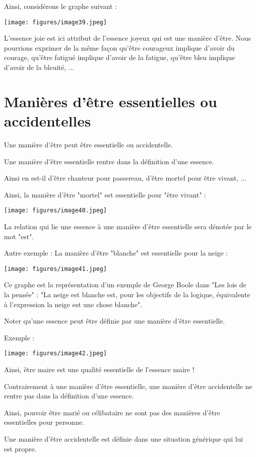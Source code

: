 \documentclass[a4paper, 12pt, openright, french]{book}
\begin{document}
Ainsi, considérons le graphe suivant :

\texttt{[image: figures/image39.jpeg]}

L'essence joie est ici attribut de
l'essence joyeux qui est une manière
d'être. Nous pourrions exprimer de la même façon
qu'être courageux implique d'avoir du
courage, qu'être fatigué implique
d'avoir de la fatigue, qu'être bleu
implique d'avoir de la bleuité, ...

\section{Manières d'être essentielles ou accidentelles}

Une manière d'être peut être essentielle ou
accidentelle.

Une manière d'être essentielle rentre dans la définition
d'une essence.

Ainsi en est-il d'être chanteur pour passereau,
d'être mortel pour être vivant, ...

Ainsi, la manière d'être "mortel" est essentielle pour
"être vivant" :

\texttt{[image: figures/image40.jpeg]}

La relation qui lie une essence à une manière d'être
essentielle sera dénotée par le mot "est".

Autre exemple : La manière d'être "blanche" est
essentielle pour la neige :

\texttt{[image: figures/image41.jpeg]}

Ce graphe est la représentation d'un exemple de George
Boole dans "Les lois de la pensée" : "La neige est blanche est, pour les
objectifs de la logique, équivalente à l'expression la
neige est une chose blanche".

Noter qu'une essence peut être définie par une manière
d'être essentielle.

Exemple :

\texttt{[image: figures/image42.jpeg]}

Ainsi, être maire est une qualité essentielle de
l'essence maire !

Contrairement à une manière d'être essentielle, une
manière d'être accidentelle ne rentre pas dans la
définition d'une essence.

Ainsi, pouvoir être marié ou célibataire ne sont pas des manières
d'être essentielles pour personne.

Une manière d'être accidentelle est définie dans une
situation générique qui lui est propre.
\end{document}
